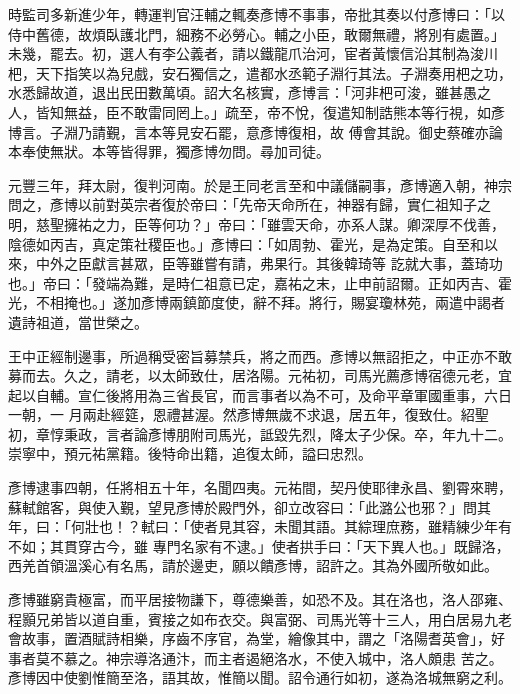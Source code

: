 \begin{pinyinscope}
 時監司多新進少年，轉運判官汪輔之輒奏彥博不事事，帝批其奏以付彥博曰：「以
 侍中舊德，故煩臥護北門，細務不必勞心。輔之小臣，敢爾無禮，將別有處置。」未幾，罷去。初，選人有李公義者，請以鐵龍爪治河，宦者黃懷信沿其制為浚川杷，天下指笑以為兒戲，安石獨信之，遣都水丞範子淵行其法。子淵奏用杷之功，水悉歸故道，退出民田數萬頃。詔大名核實，彥博言：「河非杷可浚，雖甚愚之人，皆知無益，臣不敢雷同罔上。」疏至，帝不悅，復遣知制誥熊本等行視，如彥博言。子淵乃請覲，言本等見安石罷，意彥博復相，故
 傅會其說。御史蔡確亦論本奉使無狀。本等皆得罪，獨彥博勿問。尋加司徒。



 元豐三年，拜太尉，復判河南。於是王同老言至和中議儲嗣事，彥博適入朝，神宗問之，彥博以前對英宗者復於帝曰：「先帝天命所在，神器有歸，實仁祖知子之明，慈聖擁祐之力，臣等何功？」帝曰：「雖雲天命，亦系人謀。卿深厚不伐善，陰德如丙吉，真定策社稷臣也。」彥博曰：「如周勃、霍光，是為定策。自至和以來，中外之臣獻言甚眾，臣等雖嘗有請，弗果行。其後韓琦等
 訖就大事，蓋琦功也。」帝曰：「發端為難，是時仁祖意已定，嘉祐之末，止申前詔爾。正如丙吉、霍光，不相掩也。」遂加彥博兩鎮節度使，辭不拜。將行，賜宴瓊林苑，兩遣中謁者遺詩祖道，當世榮之。



 王中正經制邊事，所過稱受密旨募禁兵，將之而西。彥博以無詔拒之，中正亦不敢募而去。久之，請老，以太師致仕，居洛陽。元祐初，司馬光薦彥博宿德元老，宜起以自輔。宣仁後將用為三省長官，而言事者以為不可，及命平章軍國重事，六日一朝，一
 月兩赴經筵，恩禮甚渥。然彥博無歲不求退，居五年，復致仕。紹聖初，章惇秉政，言者論彥博朋附司馬光，詆毀先烈，降太子少保。卒，年九十二。崇寧中，預元祐黨籍。後特命出籍，追復太師，謚曰忠烈。



 彥博逮事四朝，任將相五十年，名聞四夷。元祐間，契丹使耶律永昌、劉霄來聘，蘇軾館客，與使入覲，望見彥博於殿門外，卻立改容曰：「此潞公也邪？」問其年，曰：「何壯也！？軾曰：「使者見其容，未聞其語。其綜理庶務，雖精練少年有不如；其貫穿古今，雖
 專門名家有不逮。」使者拱手曰：「天下異人也。」既歸洛，西羌首領溫溪心有名馬，請於邊吏，願以饋彥博，詔許之。其為外國所敬如此。



 彥博雖窮貴極富，而平居接物謙下，尊德樂善，如恐不及。其在洛也，洛人邵雍、程顥兄弟皆以道自重，賓接之如布衣交。與富弼、司馬光等十三人，用白居易九老會故事，置酒賦詩相樂，序齒不序官，為堂，繪像其中，謂之「洛陽耆英會」，好事者莫不慕之。神宗導洛通汴，而主者遏絕洛水，不使入城中，洛人頗患
 苦之。彥博因中使劉惟簡至洛，語其故，惟簡以聞。詔令通行如初，遂為洛城無窮之利。




\end{pinyinscope}
